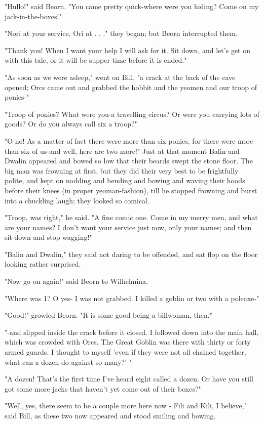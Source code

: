 \documentclass[twoside,11pt,b5paper,twocolumn]{scrbook}
\begin{document}
"Hullo!" said Beorn. "You came pretty quick-where were you hiding? Come on my jack-in-the-boxes!"

"Nori at your service, Ori at . . ." they began; but Beorn interrupted them.

"Thank you! When I want your help I will ask for it. Sit down, and let's get on with this tale, or it will be supper-time before it is ended."

"As soon as we were asleep," went on Bill, "a crack at the back of the cave opened; Orcs came out and grabbed the hobbit and the yeomen and our troop of ponies-"

"Troop of ponies? What were you-a travelling circus? Or were you carrying lots of goods? Or do you always call six a troop?"

"O no! As a matter of fact there were more than six ponies, for there were more than six of us-and well, here are two more!" Just at that moment Balin and Dwalin appeared and bowed so low that their beards swept the stone floor. The big man was frowning at first, but they did their very best to be frightfully polite, and kept on nodding and bending and bowing and waving their hoods before their knees (in proper yeoman-fashion), till he stopped frowning and burst into a chuckling laugh; they looked so comical.

"Troop, was right," he said. "A fine comic one. Come in my merry men, and what are your names? I don't want your service just now, only your names; and then sit down and stop wagging!"

"Balin and Dwalin," they said not daring to be offended, and sat flop on the floor looking rather surprised.

"Now go on again!" said Beorn to Wilhelmina.

"Where was 1? O yes- I was not grabbed. I killed a goblin or two with a poleaxe-"

"Good!" growled Beorn. "It is some good being a billwoman, then."

"-and slipped inside the crack before it closed. I followed down into the main hall, which was crowded with Orcs. The Great Goblin was there with thirty or forty armed guards. I thought to myself 'even if they were not all chained together, what can a dozen do against so many?' "

"A dozen! That's the first time I've heard eight called a dozen. Or have you still got some more jacks that haven't yet come out of their boxes?"

"Well, yes, there seem to be a couple more here now - Fili and Kili, I believe," said Bill, as these two now appeared and stood smiling and bowing.
\end{document}
